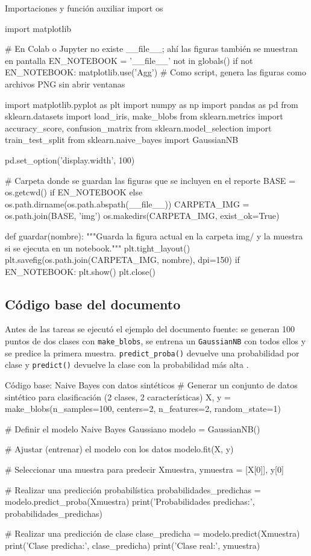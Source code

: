\documentclass[11pt,letterpaper]{article}
\begin{document}
\begin{codigo}[label=cod:comun]{Importaciones y función auxiliar}
import os

import matplotlib

# En Colab o Jupyter no existe __file__; ahí las figuras también se muestran en pantalla
EN_NOTEBOOK = '__file__' not in globals()
if not EN_NOTEBOOK:
    matplotlib.use('Agg')  # Como script, genera las figuras como archivos PNG sin abrir ventanas

import matplotlib.pyplot as plt
import numpy as np
import pandas as pd
from sklearn.datasets import load_iris, make_blobs
from sklearn.metrics import accuracy_score, confusion_matrix
from sklearn.model_selection import train_test_split
from sklearn.naive_bayes import GaussianNB

pd.set_option('display.width', 100)

# Carpeta donde se guardan las figuras que se incluyen en el reporte
BASE = os.getcwd() if EN_NOTEBOOK else os.path.dirname(os.path.abspath(__file__))
CARPETA_IMG = os.path.join(BASE, 'img')
os.makedirs(CARPETA_IMG, exist_ok=True)


def guardar(nombre):
    """Guarda la figura actual en la carpeta img/ y la muestra si se ejecuta en un notebook."""
    plt.tight_layout()
    plt.savefig(os.path.join(CARPETA_IMG, nombre), dpi=150)
    if EN_NOTEBOOK:
        plt.show()
    plt.close()
\end{codigo}

\subsection{Código base del documento}

Antes de las tareas se ejecutó el ejemplo del documento fuente: se generan 100 puntos de dos clases con \texttt{make\_blobs}, se entrena un \texttt{GaussianNB} con todos ellos y se predice la primera muestra. \texttt{predict\_proba()} devuelve una probabilidad por clase y \texttt{predict()} devuelve la clase con la probabilidad más alta \parencite{tecnm2026_documento_fuente}.

\begin{codigo}[label=cod:base]{Código base: Naive Bayes con datos sintéticos}
# Generar un conjunto de datos sintético para clasificación (2 clases, 2 características)
X, y = make_blobs(n_samples=100, centers=2, n_features=2, random_state=1)

# Definir el modelo Naive Bayes Gaussiano
modelo = GaussianNB()

# Ajustar (entrenar) el modelo con los datos
modelo.fit(X, y)

# Seleccionar una muestra para predecir
Xmuestra, ymuestra = [X[0]], y[0]

# Realizar una predicción probabilística
probabilidades_predichas = modelo.predict_proba(Xmuestra)
print('Probabilidades predichas:', probabilidades_predichas)

# Realizar una predicción de clase
clase_predicha = modelo.predict(Xmuestra)
print('Clase predicha:', clase_predicha)
print('Clase real:', ymuestra)
\end{codigo}
\end{document}
